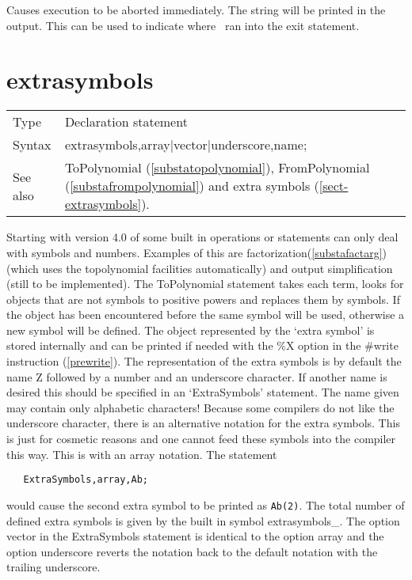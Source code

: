 \noindent Causes execution to be aborted 
immediately. The string will be printed in the output. This can be used to 
indicate where \FORM\ ran into the exit statement. \vspace{10mm}


\section{extrasymbols}
\label{substaextrasymbols}

\noindent \begin{tabular}{ll}
Type & Declaration statement\\
Syntax & extrasymbols,array|vector|underscore,name;
\\ See also & ToPolynomial (\ref{substatopolynomial}), FromPolynomial 
(\ref{substafrompolynomial}) and extra symbols 
(\ref{sect-extrasymbols}).
\end{tabular} \vspace{4mm}

\noindent Starting with version 4.0 of \FORM{} some built in operations or
statements can only deal with symbols and numbers. Examples of this are 
factorization(\ref{substafactarg}) (which uses the topolynomial facilities 
automatically) and output simplification (still to be 
implemented). The ToPolynomial statement takes each term, looks for objects 
that are not symbols to positive powers and replaces them by symbols. If 
the object has been encountered before the same symbol will be used, 
otherwise a new symbol will be defined. The object represented by the 
`extra symbol' is stored internally and can be printed if needed with the 
\%X option in the \#write instruction (\ref{prewrite}). The representation 
of the extra symbols is by default the name Z followed by a number and an 
underscore character. If another name is desired this should be specified 
in an `ExtraSymbols' statement. The name given may contain only alphabetic 
characters! Because some compilers do not like the underscore character, 
there is an alternative notation for the extra symbols. This is just for 
cosmetic reasons and one cannot feed these symbols into the compiler this 
way. This is with an array notation. The statement
\begin{verbatim}
   ExtraSymbols,array,Ab;
\end{verbatim}
would cause the second extra symbol to be printed as {\tt Ab(2)}. The total 
number of defined extra symbols is given by the built in symbol 
extrasymbols\_.
The option vector in the ExtraSymbols statement is identical to the option 
array and the option underscore reverts the notation back to the default 
notation with the trailing underscore.
\vspace{10mm}

